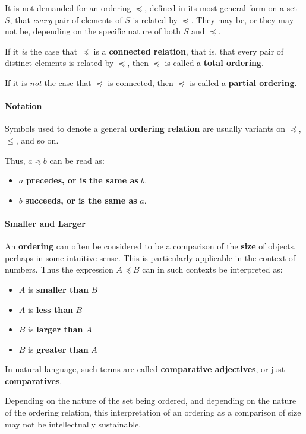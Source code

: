 It is not demanded for an ordering $\preceq$, defined in its most
general form on a set $S$, that \textit{every} pair of elements of $S$
is related by $\preceq$. They may be, or they may not be, depending on
the specific nature of both $S$ and $\preceq$.

If it \textit{is} the case that $\preceq$ is a \textbf{connected
  relation}, that is, that every pair of distinct elements is related
by $\preceq$, then $\preceq$ is called a \textbf{total ordering}.

If it is \textit{not} the case that $\preceq$ is connected, then
$\preceq$ is called a \textbf{partial ordering}.


\paragraph{Notation}

Symbols used to denote a general \textbf{ordering relation} are
usually variants on $\preceq$, $\leq$, and so on.

Thus, $a \preceq b$ can be read as:
\begin{itemize}
\item $a$ \textbf{precedes, or is the same as} $b$.
\item $b$ \textbf{succeeds, or is the same as} $a$.
\end{itemize}

\paragraph{Smaller and Larger}

An \textbf{ordering} can often be considered to be a comparison of the
\textbf{size} of objects, perhaps in some intuitive sense. This is
particularly applicable in the context of numbers. Thus the expression
$A \preceq B$ can in such contexts be interpreted as:
\begin{itemize}
\item $A$ is \textbf{smaller than} $B$
\item $A$ is \textbf{less than} $B$
\item $B$ is \textbf{larger than} $A$
\item $B$ is \textbf{greater than} $A$
\end{itemize}

In natural language, such terms are called \textbf{comparative
  adjectives}, or just \textbf{comparatives}.

Depending on the nature of the set being ordered, and depending on the
nature of the ordering relation, this interpretation of an ordering as
a comparison of size may not be intellectually sustainable.

